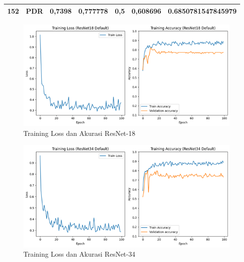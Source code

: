 \begin{table}[hbtp]
\begin{center}
\begin{tabular}{|c|l|c|l|l|l|c|}
            \multirow{-3}{*}{152} & PDR                                                & \multirow{-3}{*}{0,7398} & 0,777778                                          & 0,5                                              & 0,608696                                        & \multirow{-3}{*}{0.6850781547845979} \\ \hline
            \end{tabular}
        \end{center}
    \end{table}

    \begin{figure}[hbtp]
        \centering
        \includegraphics[scale=0.8]{gambar/TrainingGraphResNet18.png}
        \caption{Training Loss dan Akurasi ResNet-18}
        \label{Img:GraphResNet18}
    \end{figure}
    \begin{figure}[hbtp]
        \centering
        \includegraphics[scale=0.85]{gambar/TrainingGraphResNet34.png}
        \caption{Training Loss dan Akurasi ResNet-34}
        \label{Img:GraphResNet34}
    \end{figure}
